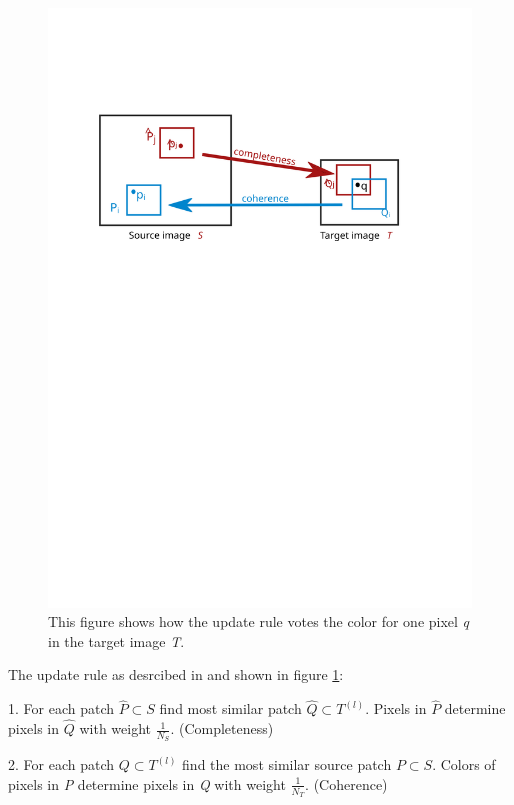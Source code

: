 \begin{figure}[h]
\centering
\includegraphics[scale=0.7]{img/updaterule}
\caption[Update rule]{This figure shows how the update rule votes the color for one pixel \textit{q} in the target image \textit{T}.}
\label{fig:Update rule}
\end{figure}

The update rule as desrcibed in \cite{bisi} and shown in figure \ref{fig:Update rule}:

\vspace{15px}
1. For each patch $\hat{P} \subset S$ find most similar patch $\hat{Q} \subset T^{(l)}$. Pixels in $\hat{P}$ determine pixels in $\hat{Q}$ with weight $\frac{1}{N_{S}}$. (Completeness)

\vspace{15px}
2. For each patch $Q \subset T^{(l)}$ find the most similar source patch $P \subset S$. Colors of pixels in \textit{P} determine pixels in \textit{Q} with weight $\frac{1}{N_{T}}$. (Coherence)


